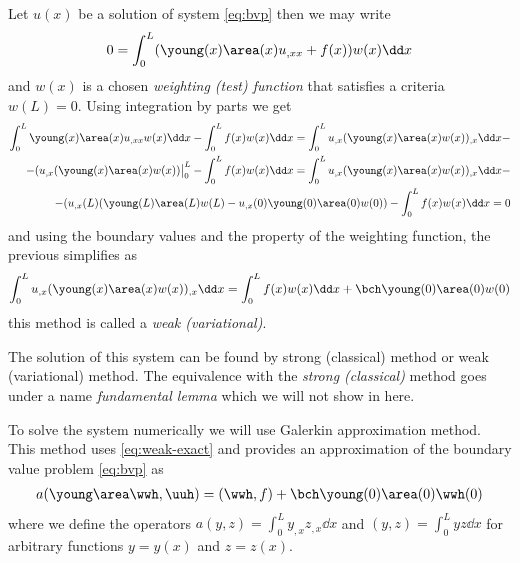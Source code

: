\documentclass[twoside,a4paper,12pt,draft]{article}
\begin{document}
Let $u(x)$ be a solution of system \eqref{eq:bvp} then we may write
%
\begin{align}
  0 = \int_0^L (\young(x) \area(x) u_{,xx} + f(x)) w(x) \dd x 
\end{align}
and $w(x)$ is a chosen \emph{weighting (test) function} that satisfies a
criteria $w(L)=0$.
%
Using integration by parts we get
%
\begin{align}
  \int_0^L \young(x) \area(x) u_{,xx} w(x) \dd x 
  -\int_0^L f(x) w(x) \dd x  =
   \int_0^L u_{,x} (\young(x) \area(x) w(x))_{,x} \dd x -\nonumber \\ -
  (u_{,x} (\young(x) \area(x)  w(x))\big|_0^L -
  \int_0^L f(x) w(x) \dd x =  
  \int_0^L u_{,x} (\young(x) \area(x) w(x))_{,x} \dd x -\nonumber \\ -
  (u_{,x}(L) (\young(L) \area(L)  w(L) -
  u_{,x}(0) \young(0) \area(0)  w(0)) 
  -\int_0^L f(x) w(x) \dd x = 0
\end{align}
%
and using the boundary values and the property of the weighting
function, the previous simplifies as
%
\begin{align}
  \int_0^L u_{,x} (\young(x) \area(x) w(x))_{,x} \dd x =  
  \int_0^L f(x) w(x) \dd x + \bch \young(0) \area(0)  w(0)
  \label{eq:weak-exact}
\end{align}
%
this method is called a \emph{weak (variational)}.

The solution of this system can be found by strong (classical) method
or weak (variational) method. The equivalence with the \emph{strong
  (classical)} method goes under a name \emph{fundamental lemma} which we will not show in here.

To solve the system numerically we will use Galerkin approximation
method. This method uses \eqref{eq:weak-exact} and provides an
approximation of the boundary value problem \eqref{eq:bvp} as
%
\begin{align}
a(\young\area\wwh,\uuh) = (\wwh,f) + \bch \young(0)\area(0)\wwh(0) \label{eq:weak-approx}
\end{align}
%
where we define the operators $a(y,z) = \int_0^L y_{,x} z_{,x} \dd x$
and $(y,z) = \int_0^L y z \dd x$ for arbitrary functions $y = y(x)$
and $z= z(x)$.
\end{document}
